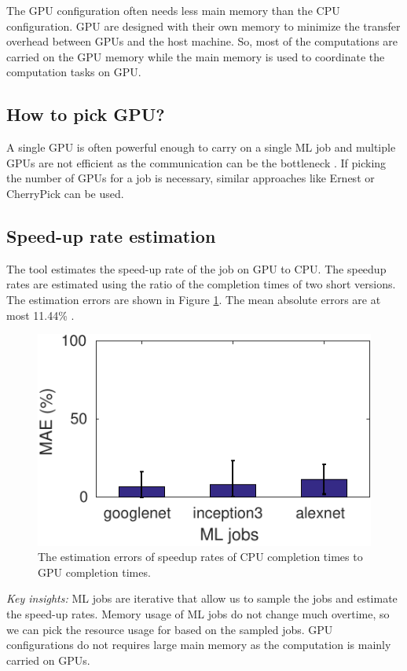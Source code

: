 
The GPU configuration often needs less main memory than the CPU configuration.
GPU are designed with their own memory to minimize the transfer overhead between GPUs and the host machine.
So, most of the computations are carried on the GPU memory while the main memory is used to coordinate the computation tasks on GPU.

\subsection{How to pick GPU?}


A single GPU is often powerful enough to carry on a single ML job and multiple GPUs are not efficient as the communication can be the bottleneck \cite{tensorflow-performance}.
If picking the number of GPUs for a job is necessary, similar approaches like Ernest \cite{ernest} or CherryPick \cite{cherrypick} can be used.

\subsection{Speed-up rate estimation}

The tool estimates the speed-up rate of the job on GPU to CPU.
The speedup rates are estimated using the ratio of the completion times of two short versions.
The estimation errors are shown in Figure \ref{fig:beta_est}.
The mean absolute errors are at most 11.44\% . 

\begin{figure}[h]
	\centering
	\includegraphics[width=0.5\linewidth]{figs/beta_est}
	\caption{The estimation errors of speedup rates of CPU completion times to GPU completion times.}
	\label{fig:beta_est}
\end{figure}




\emph{Key insights:}  ML jobs are iterative that allow us to sample the jobs and estimate the speed-up rates.
Memory usage of ML jobs do not change much overtime, so we can pick the resource usage for based on the sampled jobs.
GPU configurations do not requires large main memory as the computation is mainly carried on GPUs.



